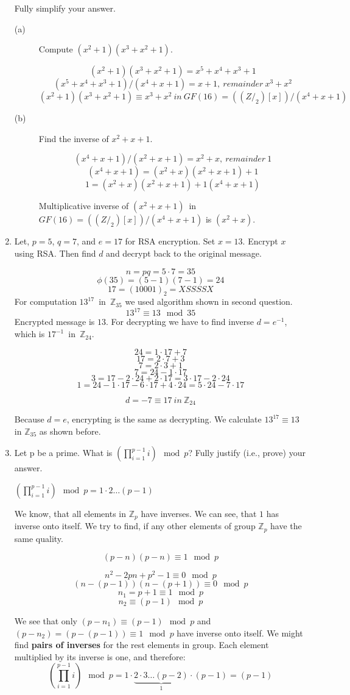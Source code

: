 \documentclass[5pt]{article}
\begin{document}
\begin{enumerate}
Fully simplify your answer.
\begin{description}
\item[(a)] Compute $(x^2 + 1)(x^3 + x^2 + 1)$.

$$(x^2 + 1)(x^3 + x^2 + 1) = x^5 + x^4 + x^3 + 1$$
$$(x^5 + x^4 + x^3 + 1)/(x^4 + x + 1) = x + 1,\ remainder\ x^3 + x^2$$
$$(x^2 + 1)(x^3 + x^2 + 1) \equiv x^3 + x^2\ in\ GF (16) = ((Z/_2)[x])/(x^4 +
x + 1)$$

\item[(b)] Find the inverse of $x^2 + x + 1$.

$$(x^4 + x + 1)/(x^2 + x + 1) = x^2 + x,\ remainder\ 1$$
$$(x^4 + x + 1) = (x^2 + x)(x^2 + x + 1) + 1$$
$$1 = (x^2 + x)(x^2 + x + 1) + 1(x^4 + x + 1)$$

Multiplicative inverse of $(x^2 + x + 1)$\  in\ $GF (16) = ((Z/_2)[x])/(x^4 + x
+ 1)$ is $(x^2 + x)$.
\end{description}
\item Let, $p = 5$, $q = 7$, and $e = 17$ for RSA encryption. Set $x = 13$.
Encrypt $x$ using RSA. Then find $d$ and decrypt back to the original message.

$$n = pq = 5\cdot7 = 35$$
$$\phi(35) = (5 - 1)(7 - 1) = 24$$
$$17 = (10001)_2 = XSSSSX$$
For computation $13^{17}$\ in\ $\mathbb{Z}_{35}$ we used algorithm shown in
second question.
$$13^{17} \equiv 13 \mod{35}$$
Encrypted message is $13$.
For decrypting we have to find inverse $d = e^{-1}$, which is $17^{-1}$\ in\
$\mathbb{Z}_{24}$.

$$24 = 1\cdot17 + 7$$
$$17 = 2\cdot7 + 3$$
$$7 = 2\cdot3 + 1$$\newline
$$7 = 24 - 1\cdot17$$
$$3 = 17 - 2\cdot24 + 2\cdot17 = 3\cdot17 - 2\cdot24$$
$$1 = 24 - 1\cdot17 - 6\cdot17 + 4\cdot24 = 5\cdot24 - 7\cdot17$$

$$d = -7 \equiv 17\ in\ \mathbb{Z}_{24}$$

Because $d = e$, encrypting is the same as decrypting. We calculate $13^{17}
\equiv 13$ in $\mathbb{Z}_{35}$ as shown before.
\item Let p be a prime. What is $(\prod_{i = 1}^{p-1} i) \mod{p}$? Fully justify
(i.e., prove) your answer.

$(\prod_{i = 1}^{p-1} i) \mod{p} = 1\cdot2\ldots(p - 1)$

We know, that all elements in $\mathbb{Z}_{p}$ have inverses. We can see, that
$1$ has inverse onto itself. We try to find, if any other elements of group
$\mathbb{Z}_{p}$ have the same quality.

$$(p - n)(p - n) \equiv 1 \mod p$$
 
$$n^2 - 2pn + p^2 - 1 \equiv 0 \mod p$$
$$(n - (p - 1))(n - (p + 1)) \equiv 0 \mod p$$
$$n_{1} = p + 1 \equiv 1 \mod p$$
$$n_{2} \equiv (p - 1) \mod p$$

We see that only $(p - n_1) \equiv (p - 1) \mod p$ and $(p - n_2) = (p - (p -1))
\equiv 1 \mod p$ have inverse onto itself. We might find \textbf{pairs of
inverses} for the rest elements in group. Each element multiplied by its inverse
is one, and therefore: $$(\prod_{i = 1}^{p-1} i) \mod{p} = 1\cdot\underbrace{2\cdot3\ldots(p -
2)}_{1}\cdot(p - 1) = (p - 1)$$

\end{enumerate}
\end{document}
